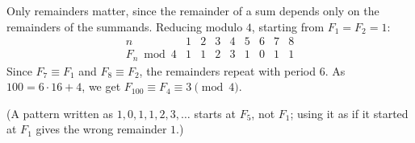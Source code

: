 Only remainders matter, since the remainder of a sum depends only on the remainders of the summands. Reducing modulo $4$, starting from $F_1=F_2=1$:
\[
\begin{array}{c|cccccccc}
n & 1&2&3&4&5&6&7&8\\\hline
F_n \bmod 4 & 1&1&2&3&1&0&1&1
\end{array}
\]
Since $F_7\equiv F_1$ and $F_8\equiv F_2$, the remainders repeat with period $6$. As $100=6\cdot16+4$, we get $F_{100}\equiv F_4\equiv\boxed{3}\pmod 4$.

(A pattern written as $1,0,1,1,2,3,\ldots$ starts at $F_5$, not $F_1$; using it as if it started at $F_1$ gives the wrong remainder $1$.)
